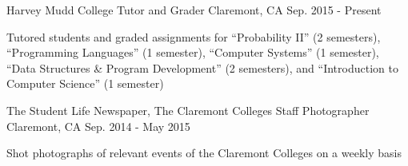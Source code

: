 

\begin{cventries}

  \cventry
    {Harvey Mudd College} %
    {Tutor and Grader} %
    {Claremont, CA} %
    {Sep. 2015 - Present} %
    {
      \begin{cvitems} %
        \item {Tutored students and graded assignments for
        ``Probability II'' (2 semesters), ``Programming Languages'' (1 semester),
        ``Computer Systems'' (1 semester),
        ``Data Structures \& Program Development'' (2 semesters),
        and ``Introduction to Computer Science'' (1 semester)}
      \end{cvitems}
    }

  \cventry
    {The Student Life Newspaper, The Claremont Colleges} %
    {Staff Photographer} %
    {Claremont, CA} %
    {Sep. 2014 - May 2015} %
    {
      \begin{cvitems} %
        \item {Shot photographs of relevant events of the Claremont Colleges on
        a weekly basis}
      \end{cvitems}
    }

\end{cventries}
